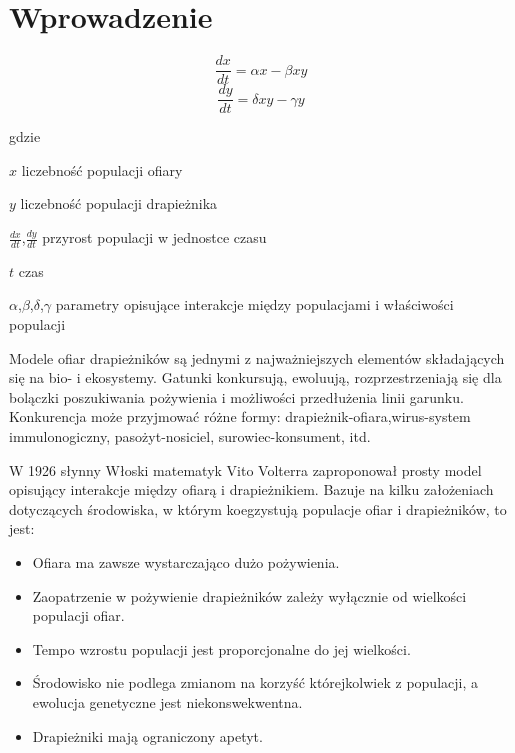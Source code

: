 \chapter{Wprowadzenie}
\label{cha:wprowadzenie}

$$	\frac{dx}{dt} = \alpha x - \beta x y $$
$$	\frac{dy}{dt} = \delta xy - \gamma y $$

gdzie

\begin{eqwhere}[2cm]
	\item[$x$] liczebność populacji ofiary
	\item[$y$] liczebność populacji drapieżnika
	\item[$\frac{dx}{dt}$,$\frac{dy}{dt}$] przyrost populacji w jednostce czasu
	\item[$t$] czas
	\item[$\alpha$,$\beta$,$\delta$,$\gamma$] parametry opisujące interakcje między populacjami i właściwości populacji
\end{eqwhere}

\noindent Modele ofiar drapieżników są jednymi z najważniejszych elementów składających się na bio- i ekosystemy. Gatunki konkursują, ewoluują, rozprzestrzeniają się dla bolączki poszukiwania pożywienia i możliwości przedłużenia linii garunku. Konkurencja może przyjmować różne formy: drapieżnik-ofiara,wirus-system immulonogiczny, pasożyt-nosiciel, surowiec-konsument, itd. 

\noindent W 1926 słynny Włoski matematyk Vito Volterra zaproponował prosty model opisujący interakcje między ofiarą i drapieżnikiem. Bazuje na kilku założeniach dotyczących środowiska, w którym koegzystują populacje ofiar i drapieżników, to jest:

\begin{itemize}
	\item Ofiara ma zawsze wystarczająco dużo pożywienia.
	
	\item Zaopatrzenie w pożywienie drapieżników zależy wyłącznie od wielkości populacji ofiar.
	
	\item Tempo wzrostu populacji jest proporcjonalne do jej wielkości.
	
	\item Środowisko nie podlega zmianom na korzyść którejkolwiek z populacji, a ewolucja genetyczne jest niekonswekwentna.
	
	\item Drapieżniki mają ograniczony apetyt.
\end{itemize}

